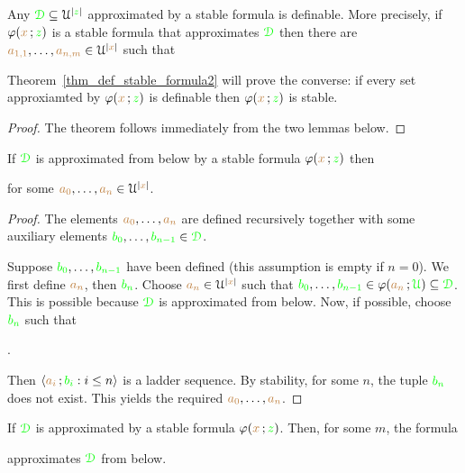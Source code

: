 \documentclass[creche.tex]{subfiles}
\begin{document}
\begin{theorem}\label{thm_def_stable_formula}
Any ${\color{green}\EuScript D}\subseteq\EuScript U^{|{\color{green} z}|}$ approximated by a stable formula is definable.
More precisely, if $\varphi({\color{brown} x}\,;{\color{green} z})$ is a stable formula that approximates ${\color{green}\EuScript D}$ then there are ${\color{brown} a_{1,1}},\dots,{\color{brown} a_{n,m}}\in\EuScript U^{|{\color{brown} x}|}$ such that 

\end{theorem}

Theorem~\ref{thm_def_stable_formula2} will prove the converse: if every set approxiamted by $\varphi({\color{brown} x}\,;{\color{green} z})$ is definable then $\varphi({\color{brown} x}\,;{\color{green} z})$ is stable.

\begin{proof}
  The theorem follows immediately from the two lemmas below.
\end{proof}

\begin{lemma}
If ${\color{green}\EuScript D}$ is approximated from below by a stable formula $\varphi({\color{brown} x}\,;{\color{green} z})$ then


for some ${\color{brown} a_0},\dots,{\color{brown} a_n}\in\EuScript U^{|{\color{brown} x}|}$. 
\end{lemma}

\begin{proof}
The elements ${\color{brown} a_0},\dots,{\color{brown} a_n}$ are defined recursively together with some auxiliary elements ${\color{green} b_0},\dots,{\color{green} b_{n-1}}\in{\color{green}\EuScript D}$.

Suppose ${\color{green} b_0},\dots,{\color{green} b_{n-1}}$ have been defined (this assumption is empty if $n=0$).
We first define ${\color{brown} a_n}$, then ${\color{green} b_n}$. 
Choose ${\color{brown} a_n}\in\EuScript U^{|{\color{brown} x}|}$ such that ${\color{green} b_0},\dots,{\color{green} b_{n-1}}\in\varphi({\color{brown} a_n}\,;{\color{green}\EuScript U})\subseteq{\color{green}\EuScript D}$.
This is possible because ${\color{green}\EuScript D}$ is approximated from below.
Now, if possible, choose ${\color{green} b_n}$ such that

.

Then $\langle{\color{brown}a_i}\,;{\color{green} b_i} : i\le n\rangle$ is a ladder sequence. 
By stability, for some $n$, the tuple ${\color{green} b_n}$ does not exist.
This yields the required ${\color{brown} a_0},\dots,{\color{brown} a_n}$.
\end{proof}

\begin{lemma}\label{lem_stab_approx_below}
If ${\color{green}\EuScript D}$ is approximated by a stable formula $\varphi({\color{brown} x}\,;{\color{green} z})$.
Then, for some $m$, the formula 


approximates ${\color{green}\EuScript D}$ from below.
\end{lemma}
\end{document}
